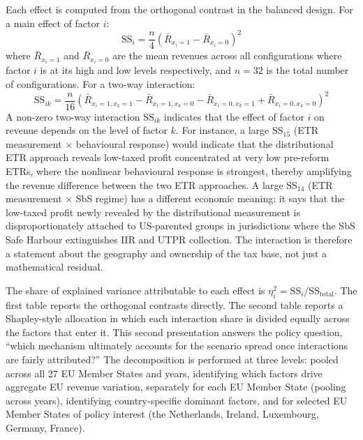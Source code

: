 \documentclass[11pt,a4paper]{article}
\begin{document}
Each effect is computed from the orthogonal contrast in the balanced design. For a main effect of factor $i$:
\begin{equation}\label{eq:main_effect}
\text{SS}_i = \frac{n}{4} \left(\bar{R}_{x_i = 1} - \bar{R}_{x_i = 0}\right)^2
\end{equation}
where $\bar{R}_{x_i = 1}$ and $\bar{R}_{x_i = 0}$ are the mean revenues across all configurations where factor $i$ is at its high and low levels respectively, and $n = 32$ is the total number of configurations. For a two-way interaction:
\begin{equation}\label{eq:interaction_effect}
\text{SS}_{ik} = \frac{n}{16} \left(\bar{R}_{x_i = 1, x_k = 1} - \bar{R}_{x_i = 1, x_k = 0} - \bar{R}_{x_i = 0, x_k = 1} + \bar{R}_{x_i = 0, x_k = 0}\right)^2
\end{equation}
A non-zero two-way interaction $\text{SS}_{ik}$ indicates that the effect of factor $i$ on revenue depends on the level of factor $k$. For instance, a large $\text{SS}_{15}$ (ETR measurement $\times$ behavioural response) would indicate that the distributional ETR approach reveals low-taxed profit concentrated at very low pre-reform ETRs, where the nonlinear behavioural response is strongest, thereby amplifying the revenue difference between the two ETR approaches. A large $\text{SS}_{14}$ (ETR measurement $\times$ SbS regime) has a different economic meaning: it says that the low-taxed profit newly revealed by the distributional measurement is disproportionately attached to US-parented groups in jurisdictions where the SbS Safe Harbour extinguishes IIR and UTPR collection. The interaction is therefore a statement about the geography and ownership of the tax base, not just a mathematical residual.

The share of explained variance attributable to each effect is $\eta_i^2 = \text{SS}_i / \text{SS}_{\text{total}}$. The first table reports the orthogonal contrasts directly. The second table reports a Shapley-style allocation in which each interaction share is divided equally across the factors that enter it. This second presentation answers the policy question, ``which mechanism ultimately accounts for the scenario spread once interactions are fairly attributed?'' The decomposition is performed at three levels: pooled across all 27 EU Member States and years, identifying which factors drive aggregate EU revenue variation, separately for each EU Member State (pooling across years), identifying country-specific dominant factors, and for selected EU Member States of policy interest (the Netherlands, Ireland, Luxembourg, Germany, France).
\end{document}
